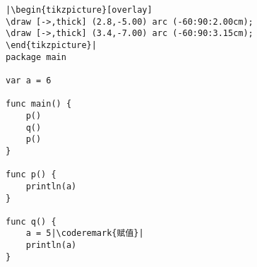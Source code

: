 \begin{lstlisting}[caption=全局作用域,label=src:scope2]
|\begin{tikzpicture}[overlay]
\draw [->,thick] (2.8,-5.00) arc (-60:90:2.00cm);
\draw [->,thick] (3.4,-7.00) arc (-60:90:3.15cm);
\end{tikzpicture}|
package main

var a = 6

func main() {
    p()
    q()
    p()
}

func p() {
    println(a)
}

func q() {
    a = 5|\coderemark{赋值}|
    println(a)
}
\end{lstlisting}
